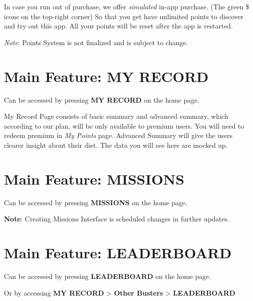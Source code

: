 \documentclass[a4paper,12pt]{article}
\begin{document}
In case you run out of purchase, we offer \textit{simulated} in-app purchase.
(The green \$ icons on the top-right corner) So that you get have unlimited points
to discover and try out this app. All your points will be reset after the app is restarted.

\textit{Note}: Points System is not finalized and is subject to change.

\pagebreak
\section{Main Feature: MY RECORD}

Can be accessed by pressing \textbf{MY RECORD} on the home page.


My Record Page consists of basic summary and advanced summary, which according
to our plan, will be only available to premium users. You will need to
redeem premium in \textit{My Points} page.
Advanced Summary will give the users clearer insight about their diet.
The data you will see here are mocked up.

\pagebreak
\section{Main Feature: MISSIONS}

Can be accessed by pressing \textbf{MISSIONS} on the home page.


\textbf{Note}: Creating Missions Interface is scheduled changes in further updates.

\pagebreak
\section{Main Feature: LEADERBOARD}

Can be accessed by pressing \textbf{LEADERBOARD} on the home page.

\noindent
Or by accessing \textbf{MY RECORD} > \textbf{Other Busters} > \textbf{LEADERBOARD}

\end{document}
